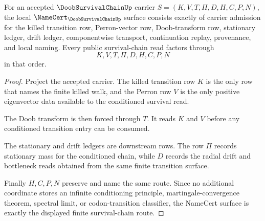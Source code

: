 \begin{theorem}
\label{thm:doob-survival-chain-namecert-obligations}
For an accepted $\DoobSurvivalChainUp$ carrier $S=(K,V,T,\Pi,D,H,C,P,N)$, the local $\NameCert_{\DoobSurvivalChainUp}$ surface consists exactly of carrier admission for the killed transition row, Perron-vector row, Doob-transform row, stationary ledger, drift ledger, componentwise transport, continuation replay, provenance, and local naming. Every public survival-chain read factors through
$$
K,V,T,\Pi,D,H,C,P,N
$$
in that order.
\end{theorem}
\begin{proof}
Project the accepted carrier. The killed transition row $K$ is the only row that names the finite killed walk, and the Perron row $V$ is the only positive eigenvector data available to the conditioned survival read.

The Doob transform is then forced through $T$. It reads $K$ and $V$ before any conditioned transition entry can be consumed.

The stationary and drift ledgers are downstream rows. The row $\Pi$ records stationary mass for the conditioned chain, while $D$ records the radial drift and bottleneck reads obtained from the same finite transition surface.

Finally $H,C,P,N$ preserve and name the same route. Since no additional coordinate stores an infinite conditioning principle, martingale-convergence theorem, spectral limit, or codon-transition classifier, the NameCert surface is exactly the displayed finite survival-chain route.
\end{proof}



